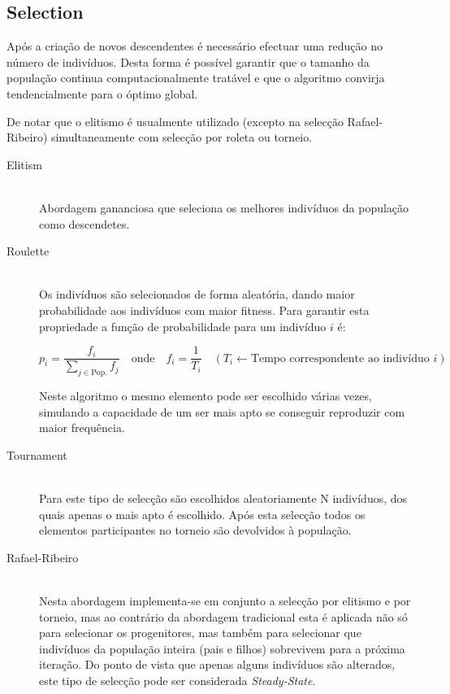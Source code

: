 \documentclass[a4paper]{article}
\begin{document}
\cleardoublepage
\subsection{Selection}
\label{subsec:selection}
\indent \indent Após a criação de novos descendentes é necessário efectuar uma redução no número de indivíduos.
Desta forma é possível garantir que o tamanho da população continua computacionalmente tratável e que o algoritmo convirja tendencialmente para o óptimo global.

\indent De notar que o elitismo é usualmente utilizado (excepto na selecção Rafael-Ribeiro) simultaneamente com selecção por roleta ou torneio.

\begin{description}
	\item[Elitism] \hfill \\
		Abordagem gananciosa que seleciona os melhores indivíduos da população como descendetes.

	\item[Roulette] \hfill \\
		Os indivíduos são selecionados de forma aleatória, dando maior probabilidade aos indivíduos com maior fitness.
		Para garantir esta propriedade a função de probabilidade para um indivíduo $i$ é:

		\[
			p_{i} = \frac{f_{i}}{\sum\limits_{j \in \text{Pop.}} f_{j}} \quad \text{onde} \quad f_i = \frac{1}{T_{i}} \quad (T_{i} \leftarrow \text{Tempo correspondente ao indivíduo } i)
		\]

		Neste algoritmo o mesmo elemento pode ser escolhido várias vezes,
		simulando a capacidade de um ser mais apto se conseguir reproduzir com maior frequência.

	\item[Tournament] \hfill \\ 
		Para este tipo de selecção são escolhidos aleatoriamente N indivíduos, dos quais apenas o mais apto é escolhido.
		Após esta selecção todos os elementos participantes no torneio são devolvidos à população.

	\item[Rafael-Ribeiro] \hfill \\
		Nesta abordagem implementa-se em conjunto a selecção por elitismo e por torneio, mas ao contrário da abordagem tradicional
		esta é aplicada não só para selecionar os progenitores, mas também para selecionar que indivíduos da população inteira (pais e filhos)
		sobrevivem para a próxima iteração. Do ponto de vista que apenas alguns indivíduos são alterados, este tipo de selecção pode ser considerada \emph{Steady-State}.

\end{description}
\end{document}
